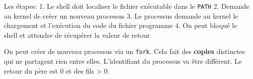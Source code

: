 Les étapes: 1. Le shell doit localiser le fichier exécutable dans le
\texttt{PATH} 2. Demande au kernel de créer un nouveau processus 3. Le
processus demande au kernel le chargement et l'exécution du code du
fichier programme 4. On peut bloqué le shell et attendre de récupérer la
valeur de retour

On peut créer de nouveau processus via un \texttt{fork}. Cela fait des
\textbf{copies} distinctes qui ne partagent rien entre elles.
L'identifiant du processus va être différent. Le retour du père est 0 et
des fils \textgreater{} 0.

\begin{Shaded}
\begin{Highlighting}[]
\PreprocessorTok{ }
\PreprocessorTok{ }

\OperatorTok{=}\OperatorTok{;} 

\OperatorTok{(}\OperatorTok{,}  \OperatorTok{*}\OperatorTok{[])} \OperatorTok{\{} 
    \OperatorTok{=}\OperatorTok{;} 
     \OperatorTok{*}\OperatorTok{;}     
\OperatorTok{=(} \OperatorTok{*)}\OperatorTok{(}\OperatorTok{(}\OperatorTok{));} 
    \OperatorTok{*}\OperatorTok{={-}}\OperatorTok{;}

\OperatorTok{;} 
\OperatorTok{=}\OperatorTok{();}
    

\end{Highlighting}
\end{Shaded}
